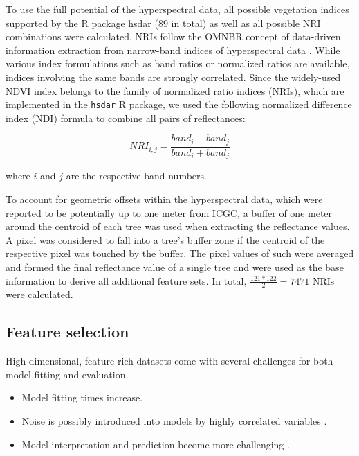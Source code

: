 \documentclass[remotesensing,article,submit,moreauthors,pdftex]{Definitions/mdpi}
\begin{document}
To use the full potential of the hyperspectral data, all possible vegetation indices supported by the R package hsdar (89 in total) as well as all possible \ac{NRI} combinations were calculated.
NRIs follow the \ac{OMNBR} concept of data-driven information extraction from narrow-band indices of hyperspectral data \cite{thenkabail2000,thenkabail2018}.
While various index formulations such as band ratios or normalized ratios are available, indices involving the same bands are strongly correlated.
Since the widely-used NDVI index belongs to the family of normalized ratio indices (NRIs), which are implemented in the \texttt{hsdar} R package, we used the following normalized difference index (NDI) formula to combine all pairs of reflectances:

\begin{equation}
	NRI_{i,j} = \frac{band_{i} - band_{j}}{band_{i} + band_{j}}
\end{equation}

\noindent
where \(i\) and \(j\) are the respective band numbers.

\bigbreak{}

To account for geometric offsets within the hyperspectral data, which were reported to be potentially up to one meter from \ac{ICGC}, a buffer of one meter around the centroid of each tree was used when extracting the reflectance values.
A pixel was considered to fall into a tree's buffer zone if the centroid of the respective pixel was touched by the buffer.
The pixel values of such were averaged and formed the final reflectance value of a single tree and were used as the base information to derive all additional feature sets.
In total, \(\frac{121*122}{2} = 7471\) NRIs were calculated.

\subsection{Feature selection}

High-dimensional, feature-rich datasets come with several challenges for both model fitting and evaluation.

\begin{itemize}
	\item Model fitting times increase.
	\item Noise is possibly introduced into models by highly correlated variables \cite{johnstoneiainm.2009}.
	\item Model interpretation and prediction become more challenging \cite{johnstoneiainm.2009}.
\end{itemize}
\end{document}
